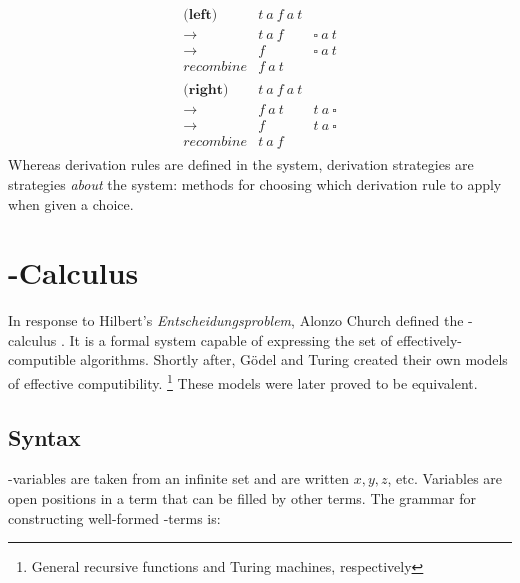 \[
\begin{array}{rcl}
  
  \textbf{(left)} & t\ a\ f\ a\ t \\
  \to                & t\ a\ f & \square\ a\ t \\
  \to                & f       & \square\ a\ t \\
  \textit{recombine} & f\ a\ t & \\
  \\
  \textbf{(right)}   & t\ a\ f\ a\ t \\
  \to                & f\ a\ t & t\ a\ \square \\
  \to                & f       & t\ a\ \square \\
  \textit{recombine} & t\ a\ f & \\
  
\end{array}
\]
Whereas derivation rules are defined in the system, 
derivation strategies are strategies \emph{about} the system: methods for choosing which derivation rule to apply when given a choice. 

\section{\lam-Calculus}

In response to Hilbert's \emph{Entscheidungsproblem}, Alonzo Church defined the \lam-calculus \cite{ChurchEnt36}. 
It is a formal system capable of expressing the set of effectively-computible algorithms.
Shortly after, G{\"o}del and Turing created their own models of effective computibility.
\footnote{General recursive functions and Turing machines, respectively} 
These models were later proved to be equivalent.

\subsection{Syntax}
  
  \lam-variables are taken from an infinite set and are written $x,y,z$, etc. Variables are open positions in a term that can be filled by other terms.
  The grammar for constructing well-formed \lam-terms is:

  \begin{figure}[!h]
  \end{figure}

